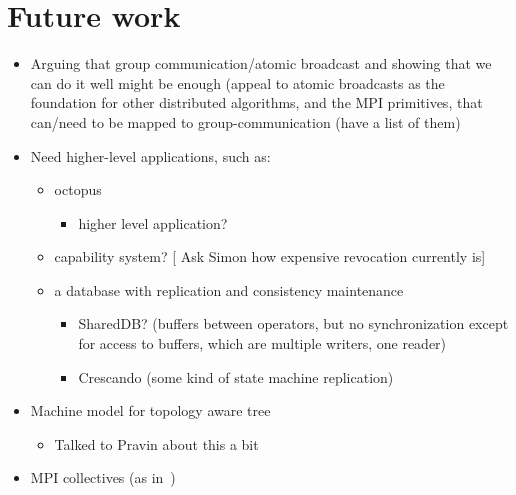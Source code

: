 \documentclass{article}
\newcommand{\stefan}[1]{
  {\color{skRed}[{\color{red}{SK}} #1]}}
\begin{document}
\section{Future work}

\begin{itemize}
\item Arguing that group communication/atomic broadcast and showing
  that we can do it well might be enough (appeal to atomic broadcasts
  as the foundation for other distributed algorithms, and the MPI
  primitives, that can/need to be mapped to group-communication (have
  a list of them) 
\item Need higher-level applications, such as:
  \begin{itemize}
  \item octopus
    \begin{itemize}
    \item higher level application?
    \end{itemize}
  \item capability system? \stefan{Ask Simon how expensive revocation
      currently is}
  \item a database with replication and consistency maintenance
    \begin{itemize}
    \item SharedDB? (buffers between operators, but no synchronization
      except for access to buffers, which are multiple writers, one
      reader)
    \item Crescando (some kind of state machine replication)
    \end{itemize}
  \end{itemize}
\item Machine model for topology aware tree
  \begin{itemize}
  \item Talked to Pravin about this a bit
  \end{itemize}
\item MPI collectives (as in~\cite{Tu2008})
\end{itemize}

\newpage



\label{LastPage}
\end{document}
